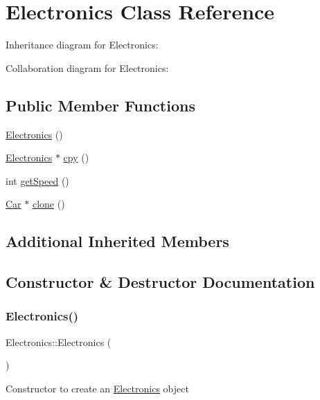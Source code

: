 \hypertarget{classElectronics}{}\section{Electronics Class Reference}
\label{classElectronics}


Inheritance diagram for Electronics\+:


Collaboration diagram for Electronics\+:
\subsection*{Public Member Functions}
\begin{DoxyCompactItemize}
\item 
\hyperlink{classElectronics_a71e4503837d87a340c2d1e8288a1c6c1}{Electronics} ()
\item 
\hyperlink{classElectronics}{Electronics} $\ast$ \hyperlink{classElectronics_a156b51c0a1a7f2850e33dbc6879b9c1e}{cpy} ()
\item 
int \hyperlink{classElectronics_a09912c940a0a8656d97f8597b766c0eb}{get\+Speed} ()
\item 
\hyperlink{classCar}{Car} $\ast$ \hyperlink{classElectronics_a292164aedff12771f4f05af648a9fc70}{clone} ()
\end{DoxyCompactItemize}
\subsection*{Additional Inherited Members}


\subsection{Constructor \& Destructor Documentation}
\mbox{\label{classElectronics_a71e4503837d87a340c2d1e8288a1c6c1}} 
\subsubsection{\texorpdfstring{Electronics()}{Electronics()}}
{\footnotesize\ttfamily Electronics\+::\+Electronics (\begin{DoxyParamCaption}{ }\end{DoxyParamCaption})}

Constructor to create an \hyperlink{classElectronics}{Electronics} object 

